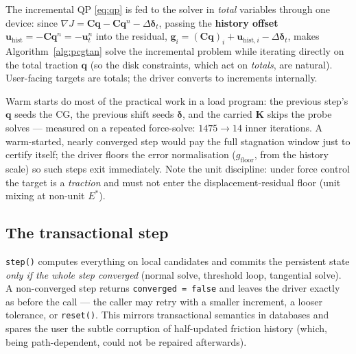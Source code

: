 \documentclass[11pt,a4paper]{article}
\newcommand{\bq}{\mathbf{q}}
\newcommand{\bu}{\mathbf{u}}
\newcommand{\bg}{\mathbf{g}}
\newcommand{\bC}{\mathbf{C}}
\newcommand{\bK}{\mathbf{K}}
\newcommand{\bdelta}{\boldsymbol{\delta}}
\newcommand{\Estar}{E^{*}}
\newcommand{\code}[1]{\texttt{#1}}
\begin{document}
The incremental QP \eqref{eq:qp} is fed to the solver in \emph{total}
variables through one device: since
$\nabla J = \bC\bq - \bC\bq^n - \Delta\bdelta_t$, passing the
\textbf{history offset} $\bu_{\mathrm{hist}} = -\bC\bq^n = -\bu_t^n$ into
the residual, $\bg_i = (\bC\bq)_i + \bu_{\mathrm{hist},i} -
\Delta\bdelta_t$, makes Algorithm~\ref{alg:pcgtan} solve the incremental
problem while iterating directly on the total traction $\bq$ (so the disk
constraints, which act on \emph{totals}, are natural). User-facing targets
are totals; the driver converts to increments internally.

Warm starts do most of the practical work in a load program: the previous
step's $\bq$ seeds the CG, the previous shift seeds $\bdelta$, and the
carried $\bK$ skips the probe solves --- measured on a repeated force-solve:
$1475 \to 14$ inner iterations. A warm-started, nearly converged step would
pay the full stagnation window just to certify itself; the driver floors the
error normalisation ($g_{\mathrm{floor}}$, from the history scale) so such
steps exit immediately. Note the unit discipline: under force control the
target is a \emph{traction} and must not enter the
displacement-residual floor (unit mixing at non-unit $\Estar$).

\subsection{The transactional step}
\label{sec:transactional}

\code{step()} computes everything on local candidates and commits the
persistent state \emph{only if the whole step converged} (normal solve,
threshold loop, tangential solve). A non-converged step returns
\code{converged = false} and leaves the driver exactly as before the call
--- the caller may retry with a smaller increment, a looser tolerance, or
\code{reset()}. This mirrors transactional semantics in databases and
spares the user the subtle corruption of half-updated friction history
(which, being path-dependent, could not be repaired afterwards).
\end{document}
